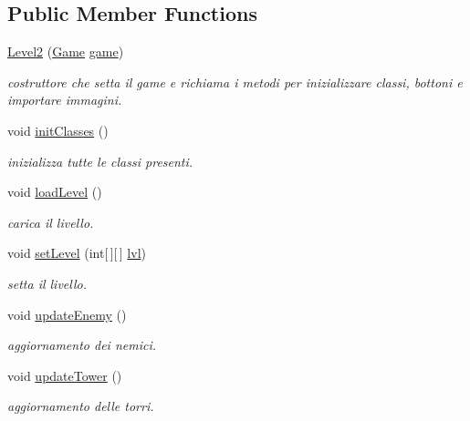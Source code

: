 \subsection*{Public Member Functions}
\begin{DoxyCompactItemize}
\item 
\hyperlink{classscenes_1_1_level2_a53060fc6a453b337e408bd89a86e32af}{Level2} (\hyperlink{classprogetto_1_1_game}{Game} \hyperlink{classscenes_1_1_game_scene_ac6a5ed6191fcf3a5bf0445921feb4f48}{game})
\begin{DoxyCompactList}\small\item\em costruttore che setta il game e richiama i metodi per inizializzare classi, bottoni e importare immagini. \end{DoxyCompactList}\item 
void \hyperlink{classscenes_1_1_level2_afe125d345675ffefe8da7e96d39773f3}{init\+Classes} ()
\begin{DoxyCompactList}\small\item\em inizializza tutte le classi presenti. \end{DoxyCompactList}\item 
void \hyperlink{classscenes_1_1_level2_a286931cc46e197f4a85af7229fdc29a4}{load\+Level} ()
\begin{DoxyCompactList}\small\item\em carica il livello. \end{DoxyCompactList}\item 
void \hyperlink{classscenes_1_1_level2_afdd7363804bf6696ce4a46d6448844ed}{set\+Level} (int\mbox{[}$\,$\mbox{]}\mbox{[}$\,$\mbox{]} \hyperlink{classscenes_1_1_level2_a4b06a2210cf5b93dda77f2a9a061d538}{lvl})
\begin{DoxyCompactList}\small\item\em setta il livello. \end{DoxyCompactList}\item 
void \hyperlink{classscenes_1_1_level2_af005ec68c869a6acd5e833cba9330a50}{update\+Enemy} ()
\begin{DoxyCompactList}\small\item\em aggiornamento dei nemici. \end{DoxyCompactList}\item 
void \hyperlink{classscenes_1_1_level2_ae4fd4a959e4d782a5e7ac0eff77ba27f}{update\+Tower} ()
\begin{DoxyCompactList}\small\item\em aggiornamento delle torri. \end{DoxyCompactList}\item 

\end{DoxyCompactItemize}
